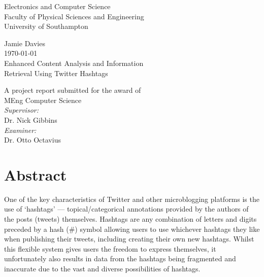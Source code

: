 \documentclass[12pt,a4paper]{article}
\begin{document}
\begin{titlepage}
\center
\vspace*{3cm}

{\Large
    Electronics and Computer Science\\
    Faculty of Physical Sciences and Engineering\\
    University of Southampton\\[1cm]
}

Jamie Davies\\
\today\\[1cm]

{\large
    Enhanced Content Analysis and Information\\
    Retrieval Using Twitter Hashtags\\[1cm]
}

A project report submitted for the award of\\
MEng Computer Science\\[1cm]

\emph{Supervisor:}\\
Dr. Nick Gibbins\\[0.5cm]

\emph{Examiner:}\\
Dr. Otto Octavius\\


\vfill
\end{titlepage}

\setcounter{secnumdepth}{0}
\section{Abstract}
One of the key characteristics of Twitter and other microblogging platforms is the use of `hashtags' --- topical/categorical annotations provided by the authors of the posts (tweets) themselves. Hashtags are any combination of letters and digits preceded by a hash (\#) symbol allowing users to use whichever hashtags they like when publishing their tweets, including creating their own new hashtags. Whilst this flexible system gives users the freedom to express themselves, it unfortunately also results in data from the hashtags being fragmented and inaccurate due to the vast and diverse possibilities of hashtags.
\end{document}
